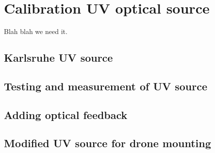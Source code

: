 
\chapter{Calibration UV optical source}
Blah blah we need it.
\section{Karlsruhe UV source}


\section{Testing and measurement of UV source}

\section{Adding optical feedback}


\section{Modified UV source for drone mounting}




